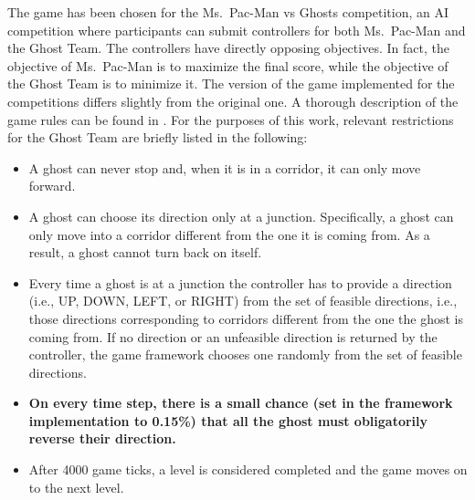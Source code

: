 \documentclass[journal]{IEEEtran}
\begin{document}
The game has been chosen for the Ms.\  Pac-Man vs Ghosts competition, an AI competition where participants can submit controllers for both Ms.\  Pac-Man and the Ghost Team. The controllers have directly opposing objectives. In fact, the objective of Ms.\  Pac-Man is to maximize the final score, while the objective of the Ghost Team is to minimize it. The version of the game implemented for the competitions differs slightly from the original one. A thorough description of the game rules can be found in \cite{MsPacManVSGhost2011}. For the purposes of this work, relevant restrictions for the Ghost Team are briefly listed in the following:
\begin{itemize}
  \item A ghost can never stop and, when it is in a corridor, it can only move forward.
  \item A ghost can choose its direction only at a junction. Specifically, a ghost can only move into a corridor different from the one it is coming from. As a result, a ghost cannot turn back on itself.
  \item Every time a ghost is at a junction the controller has to provide a direction (i.e., UP, DOWN, LEFT, or RIGHT) from the set of feasible directions, i.e., those directions corresponding to corridors different from the one the ghost is coming from. If no direction or an unfeasible direction is returned by the controller, the game framework chooses one randomly from the set of feasible directions.
  \item \textbf{On every time step, there is a small chance (set in the framework implementation to 0.15\%) that all the ghost must obligatorily reverse their direction.}
  \item After 4000 game ticks, a level is considered completed and the game moves on to the next level.
\end{itemize}
\end{document}
